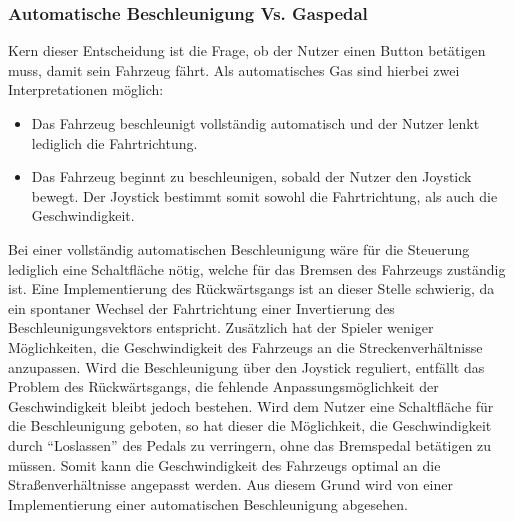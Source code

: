 	\subsubsection{Automatische Beschleunigung Vs. Gaspedal}
	Kern dieser Entscheidung ist die Frage, ob der Nutzer einen Button betätigen muss, damit sein Fahrzeug fährt. Als automatisches Gas sind hierbei zwei Interpretationen möglich:
	\begin{itemize}
	\item{ Das Fahrzeug beschleunigt vollständig automatisch und der Nutzer lenkt lediglich die Fahrtrichtung.}
	\item{ Das Fahrzeug beginnt zu beschleunigen, sobald der Nutzer den Joystick bewegt. Der Joystick bestimmt somit sowohl die Fahrtrichtung, als auch die Geschwindigkeit.}
	\end{itemize}
	Bei einer vollständig automatischen Beschleunigung wäre für die Steuerung lediglich eine Schaltfläche nötig, welche für das Bremsen des Fahrzeugs zuständig ist. Eine Implementierung des Rückwärtsgangs ist an dieser Stelle schwierig, da ein spontaner Wechsel der Fahrtrichtung einer Invertierung des Beschleunigungsvektors entspricht. Zusätzlich hat der Spieler weniger Möglichkeiten, die Geschwindigkeit des Fahrzeugs an die Streckenverhältnisse anzupassen. Wird die Beschleunigung über den Joystick reguliert, entfällt das Problem des Rückwärtsgangs, die fehlende Anpassungsmöglichkeit der Geschwindigkeit bleibt jedoch bestehen.
	Wird dem Nutzer eine Schaltfläche für die Beschleunigung geboten, so hat dieser die Möglichkeit, die Geschwindigkeit durch \enquote{Loslassen} des Pedals zu verringern, ohne das Bremspedal betätigen zu müssen.
	Somit kann die Geschwindigkeit des Fahrzeugs optimal an die Straßenverhältnisse angepasst werden. Aus diesem Grund wird von einer Implementierung einer automatischen Beschleunigung abgesehen.

